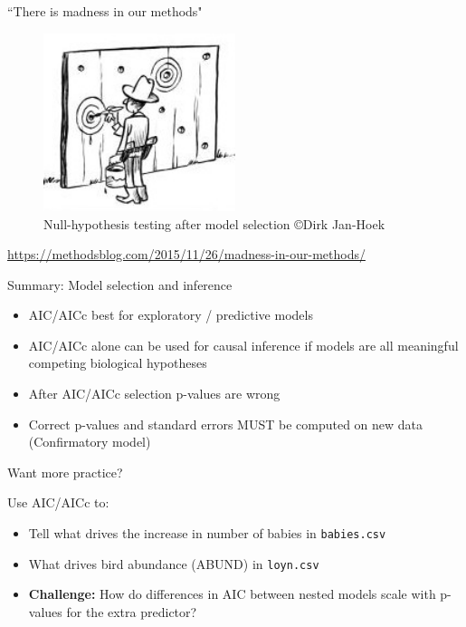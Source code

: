 \documentclass[10pt]{beamer}\usepackage[]{graphicx}\usepackage[]{color}
\begin{document}
\begin{frame}{``There is madness in our methods"}
\begin{figure}
\includegraphics[width=0.5\textwidth]{Figures/dirk-jan-hoek}
\caption{Null-hypothesis testing after model selection \copyright Dirk Jan-Hoek}
\end{figure}

\url{https://methodsblog.com/2015/11/26/madness-in-our-methods/}
\end{frame}


\begin{frame}{Summary: Model selection and inference}

  \begin{exampleblock}{}
    \begin{itemize}
      \item AIC/AICc best for exploratory / predictive models
      \item AIC/AICc alone can be used for causal inference if models are all meaningful competing biological hypotheses
      \item After AIC/AICc selection p-values are wrong
      \item Correct p-values and standard errors MUST be computed on new data (Confirmatory model)
    \end{itemize}
  \end{exampleblock}
  
\end{frame}


\begin{frame}{Want more practice? }
\begin{block}{Use AIC/AICc to:}
  \begin{itemize}
    \item Tell what drives the increase in number of babies in \texttt{babies.csv}
    \item What drives bird abundance (ABUND) in \texttt{loyn.csv}
    \item \textbf{Challenge:} How do differences in AIC between nested models scale with p-values for the extra predictor?
  \end{itemize}
\end{block}

\end{frame}
\end{document}
